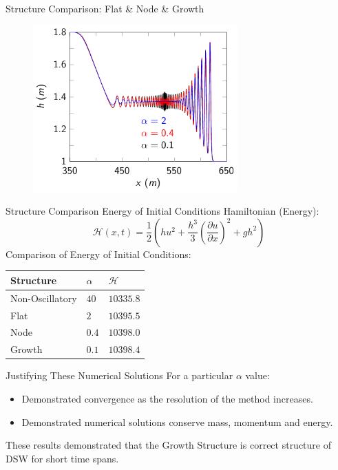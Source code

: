 \documentclass[pdf]{beamer}
\begin{document}
\begin{frame}{Structure Comparison: Flat \& Node \& Growth}
	\begin{figure}
		\includegraphics[width=0.7\textwidth]{./Pictures/Results/Example/6912.pdf}
	\end{figure}
\end{frame}

\begin{frame}{Structure Comparison Energy of Initial Conditions}
	Hamiltonian (Energy):
	\[\mathcal{H}(x,t) =\frac{1}{2} \left(hu^2 + \frac{h^3}{3}\left(\frac{\partial u}{\partial x}\right)^2 + gh^2\right) \]
	\newline 
	Comparison of Energy of Initial Conditions:
	\begin{center}
		\begin{tabular}{l | l | l}
			Structure & $\alpha$ & $\mathcal{H}$\\
			\hline
			Non-Oscillatory & $40$ & $10335.8$ \\
			Flat & $2$ & $10395.5$\\
			Node & $0.4$ & $10398.0$ \\
			Growth & $0.1$ & $10398.4$
		\end{tabular}
	\end{center}


\end{frame}

\begin{frame}{Justifying These Numerical Solutions}
	For a particular $\alpha$ value:
	\begin{itemize}
		\item Demonstrated convergence as the resolution of the method increases.
		\item Demonstrated numerical solutions conserve mass, momentum and energy.
	\end{itemize}
	These results demonstrated that the Growth Structure is correct structure of DSW for short time spans.
\end{frame}
\end{document}

